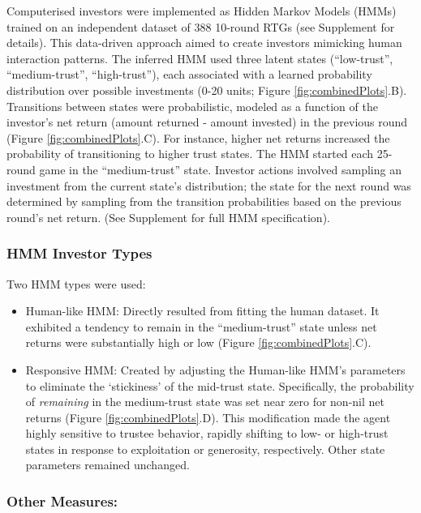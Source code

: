 \documentclass[
]{article}
\providecommand{\tightlist}{%
  \setlength{\itemsep}{0pt}\setlength{\parskip}{0pt}}
\begin{document}
Computerised investors were implemented as Hidden Markov Models (HMMs) trained on an independent dataset of 388 10-round RTGs (see Supplement for details). This data-driven approach aimed to create investors mimicking human interaction patterns. The inferred HMM used three latent states (``low-trust'', ``medium-trust'', ``high-trust''), each associated with a learned probability distribution over possible investments (0-20 units; Figure \ref{fig:combinedPlots}.B). Transitions between states were probabilistic, modeled as a function of the investor's net return (amount returned - amount invested) in the previous round (Figure \ref{fig:combinedPlots}.C). For instance, higher net returns increased the probability of transitioning to higher trust states. The HMM started each 25-round game in the ``medium-trust'' state. Investor actions involved sampling an investment from the current state's distribution; the state for the next round was determined by sampling from the transition probabilities based on the previous round's net return. (See Supplement for full HMM specification).

\subsubsection{HMM Investor Types}\label{hmm-investor-types}

Two HMM types were used:

\begin{itemize}
\tightlist
\item
  Human-like HMM: Directly resulted from fitting the human dataset. It exhibited a tendency to remain in the ``medium-trust'' state unless net returns were substantially high or low (Figure \ref{fig:combinedPlots}.C).
\item
  Responsive HMM: Created by adjusting the Human-like HMM's parameters to eliminate the `stickiness' of the mid-trust state. Specifically, the probability of \emph{remaining} in the medium-trust state was set near zero for non-nil net returns (Figure \ref{fig:combinedPlots}.D). This modification made the agent highly sensitive to trustee behavior, rapidly shifting to low- or high-trust states in response to exploitation or generosity, respectively. Other state parameters remained unchanged.
\end{itemize}

\subsubsection{Other Measures:}\label{other-measures}
\end{document}
